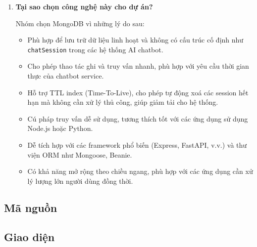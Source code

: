 \begin{enumerate}
	\item \textbf{Tại sao chọn công nghệ này cho dự án?}
	
	Nhóm chọn MongoDB vì những lý do sau:
	\begin{itemize}
		\item Phù hợp để lưu trữ dữ liệu linh hoạt và không có cấu trúc cố định như \texttt{chatSession} trong các hệ thống AI chatbot.
		\item Cho phép thao tác ghi và truy vấn nhanh, phù hợp với yêu cầu thời gian thực của chatbot service.
		\item Hỗ trợ TTL index (Time-To-Live), cho phép tự động xoá các session hết hạn mà không cần xử lý thủ công, giúp giảm tải cho hệ thống.
		\item Cú pháp truy vấn dễ sử dụng, tương thích tốt với các ứng dụng sử dụng Node.js hoặc Python.
		\item Dễ tích hợp với các framework phổ biến (Express, FastAPI, v.v.) và thư viện ORM như Mongoose, Beanie.
		\item Có khả năng mở rộng theo chiều ngang, phù hợp với các ứng dụng cần xử lý lượng lớn người dùng đồng thời.
	\end{itemize}
	
\end{enumerate}

\renewcommand{\labelenumi}{\arabic{enumi}.}
%
\subsection{Mã nguồn}

\subsection{Giao diện}


% 
